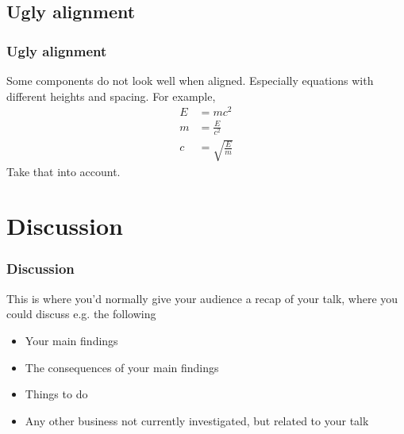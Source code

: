 \documentclass[aspectratio=169]{beamer} %
\begin{document}
\subsection{Ugly alignment}
\begin{frame}
\frametitle{Ugly alignment}
Some components do not look well when aligned. Especially equations with different heights and spacing. For example, 
\begin{align}
E&=mc^2\\
m&=\frac{E}{c^2}\\
c&=\sqrt{\frac{E}{m}}
\end{align}
Take that into account. 
\end{frame}


\section{Discussion}
\begin{frame}
\frametitle{Discussion}
This is where you'd normally give your audience a recap of your talk, where you could discuss e.g. the following
\begin{itemize}
\item Your main findings
\item The consequences of your main findings
\item Things to do
\item Any other business not currently investigated, but related to your talk
\end{itemize}
\end{frame}
\end{document}
